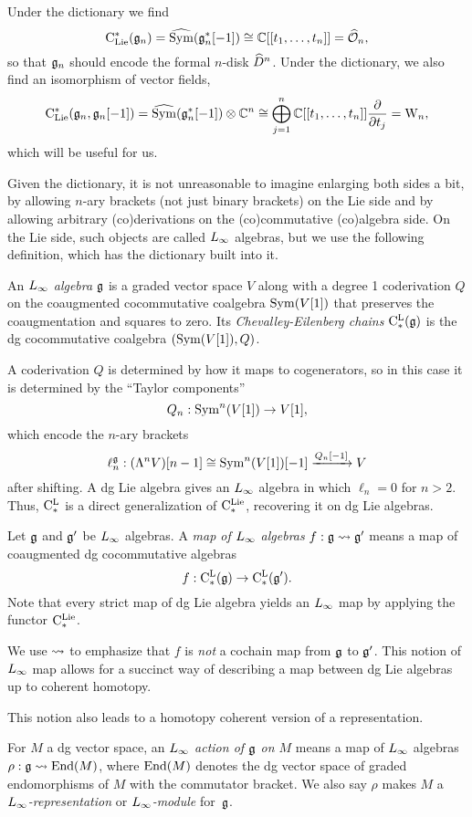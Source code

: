 Under the dictionary we find
$${\rm C}_{\rm Lie}^*(\mathfrak g_n) = \widehat{{\rm Sym}}(\mathfrak g_n^*[-1]) \cong \mathbb C[[t_1,\ldots,t_n]] = \widehat{\mathcal O}_n,$$
so that $\mathfrak g_n$ should encode the formal $n$-disk $\widehat{D}^n$.
Under the dictionary, we also find an isomorphism of vector fields,
$${\rm C}_{\rm Lie}^*(\mathfrak g_n,\mathfrak g_n[-1]) = \widehat{{\rm Sym}}(\mathfrak g_n^*[-1]) \otimes \mathbb C^n \cong \bigoplus_{j=1}^n \mathbb C[[t_1,\ldots,t_n]] \frac{\partial}{\partial t_j} = {{\rm W}_n},$$
which will be useful for us.

Given the dictionary, it is not unreasonable to imagine enlarging both sides a bit, 
by allowing $n$-ary brackets (not just binary brackets) on the Lie side
and by allowing arbitrary (co)derivations on the (co)commutative (co)algebra side.
On the Lie side, such objects are called $\L8$ algebras,
but we use the following definition, which has the dictionary built into it.

\begin{dfn}
An {\em $\L8$ algebra} $\mathfrak g$ is a graded vector space $V$ along with
a degree 1 coderivation $Q$ on the coaugmented cocommutative coalgebra
${\rm Sym}(V[1])$ that preserves the coaugmentation and squares to zero.
Its {\em Chevalley-Eilenberg chains} ${\rm C}^{\rm L}_*(\mathfrak g)$ is the dg cocommutative
coalgebra $({\rm Sym}(V[1]),Q)$.
\end{dfn}

A coderivation $Q$ is determined by how it maps to cogenerators, 
so in this case it is determined by the ``Taylor components''
\[
Q_n: {\rm Sym}^n(V[1]) \to V[1],
\]
which encode the $n$-ary brackets
\[
\ell_n^\mathfrak g: (\Lambda^n V)[n-1] \cong {\rm Sym}^n(V[1])[-1] \xrightarrow{Q_n[-1]} V
\]
after shifting.
A dg Lie algebra gives an $\L8$ algebra in which $\ell_n = 0$ for $n > 2$.
Thus, ${\rm C}^{\rm L}_*$ is a direct generalization of ${\rm C}^{\rm Lie}_*$, recovering it on dg Lie algebras.

\begin{dfn}
Let $\mathfrak g$ and $\mathfrak g'$ be $\L8$ algebras.
A {\em map of $\L8$ algebras} $f : \fg \l8to \fg'$ means a map of coaugmented dg cocommutative algebras
\[
f: {\rm C}^{\rm L}_*(\mathfrak g) \to {\rm C}^{\rm L}_*(\mathfrak g').
\]
Note that every strict map of dg Lie algebra yields an $\L8$ map by applying the functor ${\rm C}^{\rm Lie}_*$.
\end{dfn}

We use $\l8to$ to emphasize that $f$ is {\em not} a cochain map from $\mathfrak g$ to $\mathfrak g'$.
This notion of $\L8$ map allows for a succinct way of describing a map between dg Lie algebras up to coherent homotopy.

This notion also leads to a homotopy coherent version of a representation.

\begin{dfn}
For $M$ a dg vector space, an {\em $\L8$ action of $\mathfrak g$ on $M$} means a map of $\L8$ algebras
$\rho: \fg \l8to \End(M)$, where ${\rm End}(M)$ denotes the dg vector space of graded endomorphisms of $M$
with the commutator bracket. We also say $\rho$ makes $M$ a {\em $\L8$-representation} or {\em $\L8$-module}
for~$\mathfrak g$.
\end{dfn}

